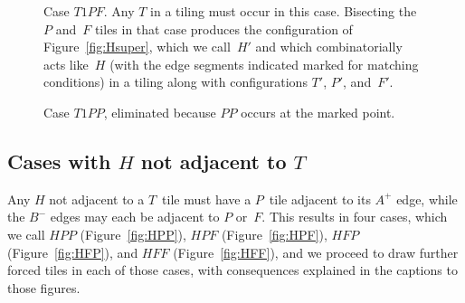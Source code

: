 \begin{figure}[htp!]
\begin{center}
\end{center}
\caption{Case $T1PF$.  Any $T$ in a tiling must occur in this case.
  Bisecting the $P$ and~$F$ tiles in that case produces the
  configuration of Figure~\ref{fig:Hsuper}, which we call~$H'$ and
  which combinatorially acts like~$H$ (with the edge segments
  indicated marked for matching conditions) in a tiling along with
  configurations $T'$, $P'$, and~$F'$.}
\label{fig:T1PF}
\end{figure}

\begin{figure}[htp!]
\begin{center}
\end{center}
\caption{Case $T1PP$, eliminated because $PP$ occurs at the marked point.}
\label{fig:T1PP}
\end{figure}

\FloatBarrier

\subsection{Cases with $H$ not adjacent to $T$}

Any $H$ not adjacent to a $T$~tile must have a $P$~tile adjacent to
its $A^+$ edge, while the $B^-$ edges may each be adjacent to $P$
or~$F$.  This results in four cases, which we call $HPP$
(Figure~\ref{fig:HPP}), $HPF$ (Figure~\ref{fig:HPF}), $HFP$
(Figure~\ref{fig:HFP}), and $HFF$ (Figure~\ref{fig:HFF}), and we
proceed to draw further forced tiles in each of those cases, with
consequences explained in the captions to those figures.

